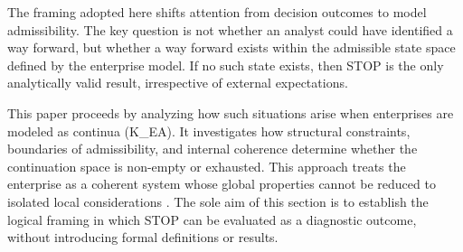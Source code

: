 The framing adopted here shifts attention from decision outcomes to model admissibility. The key question is not whether an analyst could have identified a way forward, but whether a way forward exists within the admissible state space defined by the enterprise model. If no such state exists, then STOP is the only analytically valid result, irrespective of external expectations.

This paper proceeds by analyzing how such situations arise when enterprises are modeled as continua (K\_EA). It investigates how structural constraints, boundaries of admissibility, and internal coherence determine whether the continuation space is non-empty or exhausted. This approach treats the enterprise as a coherent system whose global properties cannot be reduced to isolated local considerations \cite{bertalanffy1968}. The sole aim of this section is to establish the logical framing in which STOP can be evaluated as a diagnostic outcome, without introducing formal definitions or results.
